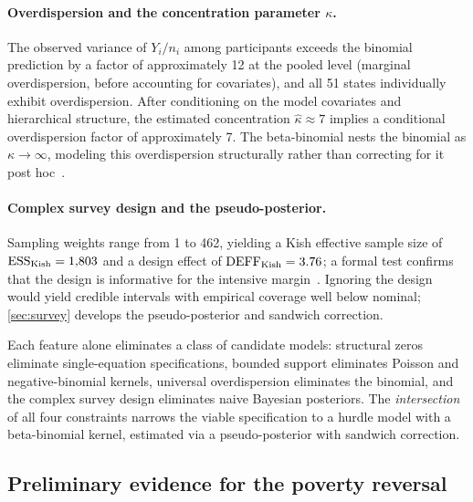 \paragraph{Overdispersion and the concentration parameter $\kappa$.}
The observed variance of $Y_i/n_i$ among participants exceeds the
binomial prediction by a factor of approximately 12 at the pooled level
(marginal overdispersion, before accounting for covariates),
and all 51 states individually exhibit overdispersion.  After conditioning
on the model covariates and hierarchical structure, the estimated
concentration $\hat{\kappa} \approx 7$ implies a conditional overdispersion
factor of approximately 7.  The beta-binomial
nests the binomial as $\kappa \to \infty$, modeling this overdispersion
structurally rather than correcting for it post hoc~\citep{Prentice1986}.

\paragraph{Complex survey design and the pseudo-posterior.}
Sampling weights range from 1 to 462, yielding a Kish effective sample
size of $\text{ESS}_{\mathrm{Kish}} = 1{,}803$ and a design effect of
$\text{DEFF}_{\mathrm{Kish}} = 3.76$; a formal test confirms that the design
is informative for the intensive margin~\citep{Pfeffermann1993}.
Ignoring the design would yield credible intervals with empirical
coverage well below nominal; \cref{sec:survey} develops the
pseudo-posterior and sandwich correction.

Each feature alone eliminates a class of candidate models: structural
zeros eliminate single-equation specifications, bounded support
eliminates Poisson and negative-binomial kernels, universal
overdispersion eliminates the binomial, and the complex survey design
eliminates naive Bayesian posteriors.  The \emph{intersection} of all
four constraints narrows the viable specification to a hurdle model with
a beta-binomial kernel, estimated via a pseudo-posterior with sandwich
correction.


\subsection{Preliminary evidence for the poverty reversal}\label{sec:prelim}

